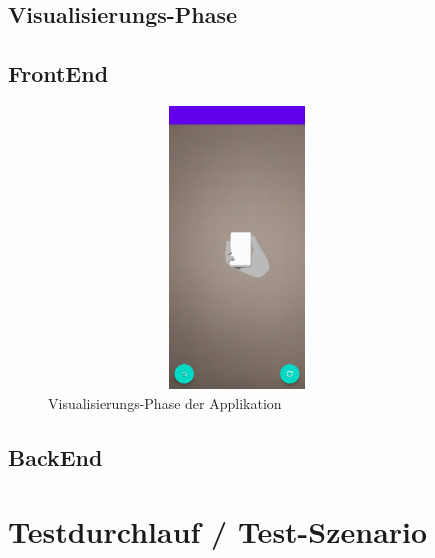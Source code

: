 \subsection{Visualisierungs-Phase} 
\subsection*{FrontEnd}
\begin{figure}[hbt!]
    \centering
    \includegraphics[width=10cm,height=7.5cm,keepaspectratio]{4Umsetzung/Bilder/visual-phase.jpg}
    \caption{Visualisierungs-Phase der Applikation}
    \label{pic:visual}
\end{figure}
\subsection*{BackEnd}

\section{Testdurchlauf / Test-Szenario}
\label{chap:testdurchlauf}